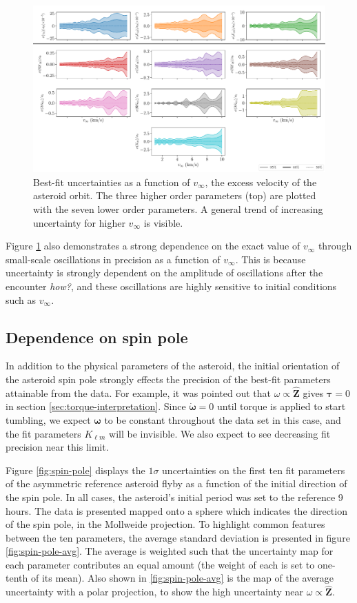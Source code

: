 \documentclass{aastex631}
\newcommand{\unit}[1]{\hat{\bm{#1}}}
\newcommand{\jtd}[1]{{\color{red}\textit{#1}}}
\begin{document}
\begin{figure}
  \centering
  \includegraphics[width=\textwidth]{scan-vex.pdf}
  \caption{Best-fit uncertainties as a function of $v_\infty$, the excess velocity of the asteroid orbit. The three higher order parameters (top) are plotted with the seven lower order parameters. A general trend of increasing uncertainty for higher $v_\infty$ is visible.}
  \label{fig:scan-vex}
\end{figure}

Figure \ref{fig:scan-vex} also demonstrates a strong dependence on the exact value of $v_\infty$ through small-scale oscillations in precision as a function of $v_\infty$. This is because uncertainty is strongly dependent on the amplitude of oscillations after the encounter \jtd{how?}, and these oscillations are highly sensitive to initial conditions such as $v_\infty$.


\subsection{Dependence on spin pole}
In addition to the physical parameters of the asteroid, the initial orientation of the asteroid spin pole strongly effects the precision of the best-fit parameters attainable from the data. For example, it was pointed out that $\omega \propto \unit Z$ gives $\bm \tau = 0$ in section \ref{sec:torque-interpretation}. Since $\dot {\bm \omega} = 0$ until torque is applied to start tumbling, we expect $\bm \omega$ to be constant throughout the data set in this case, and the fit parameters $K_{\ell m}$ will be invisible. We also expect to see decreasing fit precision near this limit.

Figure \ref{fig:spin-pole} displays the $1\sigma$ uncertainties on the first ten fit parameters of the asymmetric reference asteroid flyby as a function of the initial direction of the spin pole. In all cases, the asteroid's initial period was set to the reference 9 hours. The data is presented mapped onto a sphere which indicates the direction of the spin pole, in the Mollweide projection. To highlight common features between the ten parameters, the average standard deviation is presented in figure \ref{fig:spin-pole-avg}. The average is weighted such that the uncertainty map for each parameter contributes an equal amount (the weight of each is set to one-tenth of its mean). Also shown in \ref{fig:spin-pole-avg} is the map of the average uncertainty with a polar projection, to show the high uncertainty near $\omega \propto \unit Z$.
\end{document}
